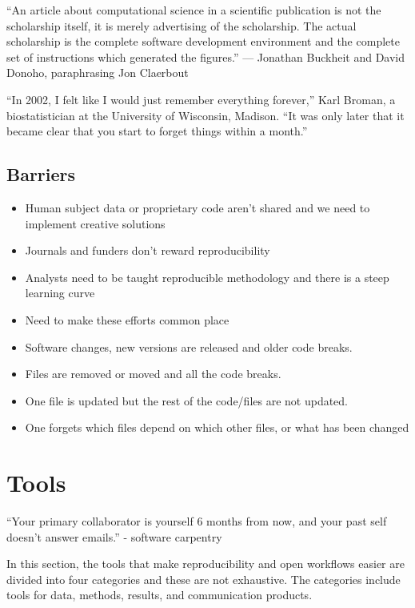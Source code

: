 \documentclass[
  12pt,
]{book}
\providecommand{\tightlist}{%
  \setlength{\itemsep}{0pt}\setlength{\parskip}{0pt}}
\begin{document}
``An article about computational science in a scientific publication is not the scholarship itself,
it is merely advertising of the scholarship. The actual scholarship is the complete software development environment and the complete set of instructions which generated the figures.''
--- Jonathan Buckheit and David Donoho, paraphrasing Jon Claerbout

``In 2002, I felt like I would just remember everything forever,'' Karl Broman, a biostatistician at the University of Wisconsin, Madison. ``It was only later that it became clear that you start to forget things within a month.''

\hypertarget{barriers}{%
\subsection{Barriers}\label{barriers}}

\begin{itemize}
\tightlist
\item
  Human subject data or proprietary code aren't shared and we need to implement creative solutions
\item
  Journals and funders don't reward reproducibility
\item
  Analysts need to be taught reproducible methodology and there is a steep learning curve
\item
  Need to make these efforts common place
\item
  Software changes, new versions are released and older code breaks.
\item
  Files are removed or moved and all the code breaks.
\item
  One file is updated but the rest of the code/files are not updated.
\item
  One forgets which files depend on which other files, or what has been changed
\end{itemize}

\hypertarget{tools}{%
\section{Tools}\label{tools}}

``Your primary collaborator is yourself 6 months from now, and your past self doesn't answer emails.'' - software carpentry

In this section, the tools that make reproducibility and open workflows easier are divided into four categories and these are not exhaustive. The categories include tools for data, methods, results, and communication products.
\end{document}
